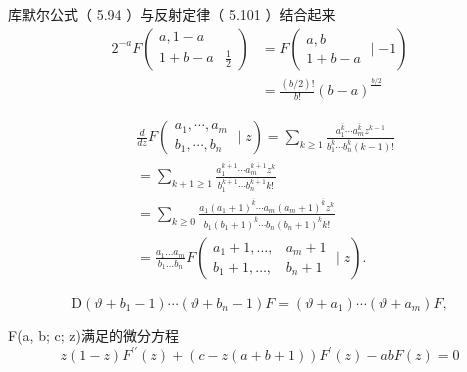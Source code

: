 库默尔公式（ 5.94 ）与反射定律（ 5.101 ）结合起来
\begin{equation}
    \begin{aligned}
    2^{-a} F\left(\begin{array}{c|c}
    a, 1-a \\
    1+b-a & \frac{1}{2}
    \end{array}\right) &=F\left(\begin{array}{c}
    a, b \\
    1+b-a
    \end{array} \mid-1\right) \\
    &=\frac{(b / 2) !}{b !}(b-a)^{\frac{b / 2}{}}
    \end{aligned}
\end{equation}

\setcounter{equation}{105}
\begin{equation}
    \begin{aligned}
    &\frac{d}{d z} F\left(\begin{array}{l}
    a_{1}, \cdots, a_{m} \\
    b_{1}, \cdots, b_{n}
    \end{array} \mid z\right)=\sum_{k \geqslant 1} \frac{a_{1}^{\bar{k}} \cdots a_{m}^{\bar{k}} z^{k-1}}{b_{1}^{\bar{k}} \cdots b_{n}^{\bar{k}}(k-1) !}\\
    &=\sum_{k+1 \geqslant 1} \frac{a_{1}^{\overline{k+1}} \cdots a_{m}^{\overline{k+1}} z^{k}}{b_{1}^{\overline{k+1}} \cdots b_{n}^{\overline{k+1}} k !}\\
    &=\sum_{k \geqslant 0} \frac{a_{1}\left(a_{1}+1\right)^{\bar{k}} \cdots a_{m}\left(a_{m}+1\right)^{\bar{k}} z^{k}}{b_{1}\left(b_{1}+1\right)^{\bar{k}} \cdots b_{n}\left(b_{n}+1\right)^{\bar{k}} k !}\\
    &=\frac{a_{1} \ldots a_{m}}{b_{1} \ldots b_{n}} F\left(\begin{array}{ll}
    a_{1}+1, \ldots, & a_{m}+1 \\
    b_{1}+1, \ldots, & b_{n}+1
    \end{array} \mid z\right) \text {. }
    \end{aligned}
\end{equation}

\begin{equation}
    \mathrm{D}\left(\vartheta+b_{1}-1\right) \cdots\left(\vartheta+b_{n}-1\right) F=\left(\vartheta+a_{1}\right) \cdots\left(\vartheta+a_{m}\right) F,
\end{equation}

F(a, b; c; z)满足的微分方程
\begin{equation}
    z(1-z) F^{\prime \prime}(z)+(c-z(a+b+1)) F^{\prime}(z)-a b F(z)=0
\end{equation}

